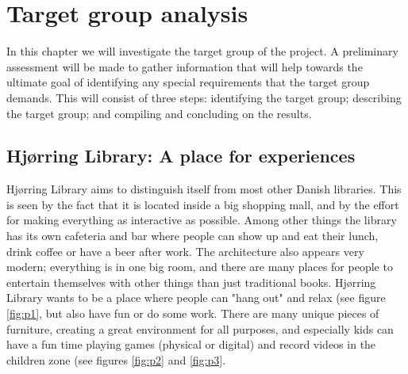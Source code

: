 \chapter{Target group analysis}
In this chapter we will investigate the target group of the project. A preliminary assessment will be made to gather information that will help towards the ultimate goal of identifying any special requirements that the target group demands. This will consist of three steps: identifying the target group; describing the target group; and compiling and concluding on the results.

\section{Hj{\o}rring Library: A place for experiences}\label{hjoerring}
Hj{\o}rring Library aims to distinguish itself from most other Danish libraries. This is seen by the fact that it is located inside a big shopping mall, and by the effort for making everything as interactive as possible. Among other things the library has its own cafeteria and bar where people can show up and eat their lunch, drink coffee or have a beer after work. The architecture also appears very modern; everything is in one big room, and there are many places for people to entertain themselves with other things than just traditional books. Hj{\o}rring Library wants to be a place where people can "hang out" and relax (see figure \ref{fig:p1}, but also have fun or do some work. There are many unique pieces of furniture, creating a great environment for all purposes, and especially kids can have a fun time playing games (physical or digital) and record videos in the children zone (see figures \ref{fig:p2} and \ref{fig:p3}.

